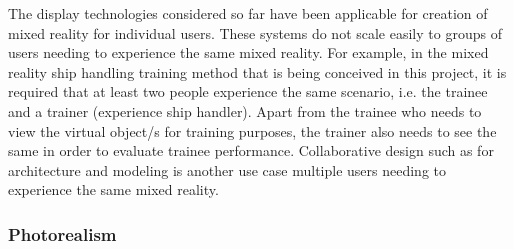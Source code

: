 The display technologies considered so far have been applicable for creation of mixed reality for individual users. These systems do not scale easily to groups of users needing to experience the same mixed reality. For example, in the mixed reality ship handling training method that is being conceived in this project, it is required that at least two people experience the same scenario, i.e. the trainee and a trainer (experience ship handler). Apart from the trainee who needs to view the virtual object/s for training purposes, the trainer also needs to see the same in order to evaluate trainee performance. Collaborative design such as for architecture and modeling is another use case multiple users needing to experience the same mixed reality. 

\subsubsection{Photorealism}
\label{sec:photorealism}

